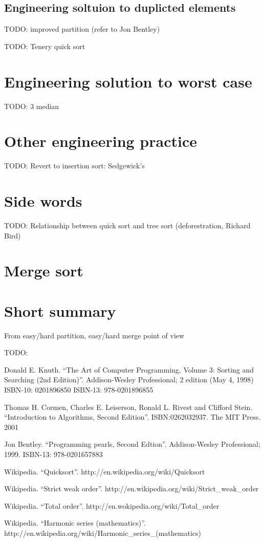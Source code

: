 \documentclass{article}
\begin{document}
\subsection{Engineering soltuion to duplicted elements}
TODO: improved partition (refer to Jon Bentley)

TODO: Tenery quick sort

\section{Engineering solution to worst case}
TODO: 3 median

\section{Other engineering practice}
TODO: Revert to insertion sort: Sedgewick's 

\section{Side words}
TODO: Relationship between quick sort and tree sort (deforestration, Richard Bird)


\section{Merge sort}


\section{Short summary} 
From easy/hard partition, easy/hard merge point of view

TODO:

\begin{thebibliography}{99}

Donald E. Knuth. ``The Art of Computer Programming, Volume 3: Sorting and Searching (2nd Edition)''. Addison-Wesley Professional; 2 edition (May 4, 1998) ISBN-10: 0201896850 ISBN-13: 978-0201896855

Thomas H. Cormen, Charles E. Leiserson, Ronald L. Rivest and Clifford Stein. 
``Introduction to Algorithms, Second Edition''. ISBN:0262032937. The MIT Press. 2001

Jon Bentley. ``Programming pearls, Second Edtion''. Addison-Wesley Professional; 1999. ISBN-13: 978-0201657883

Wikipedia. ``Quicksort''. http://en.wikipedia.org/wiki/Quicksort

Wikipedia. ``Strict weak order''. http://en.wikipedia.org/wiki/Strict\_weak\_order

Wikipedia. ``Total order''. http://en.wokipedia.org/wiki/Total\_order

Wikipedia. ``Harmonic series (mathematics)''. http://en.wikipedia.org/wiki/Harmonic\_series\_(mathematics)

\end{thebibliography}

\ifx\wholebook\relax\else
\end{document}
